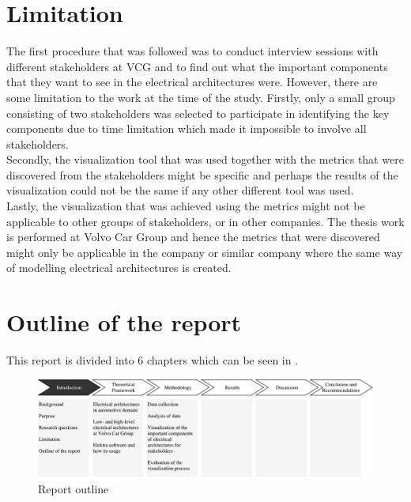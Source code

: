 \section{Limitation} \label{Limitation_ref}
The first procedure that was followed was to conduct interview sessions with different stakeholders at VCG and to find out what the important components that they want to see in the electrical architectures were. However, there are some limitation to the work at the time of the study. Firstly, only a small group consisting of two stakeholders was selected to participate in identifying the key components due to time limitation which made it impossible to involve all stakeholders. \\

Secondly, the visualization tool that was used together with the metrics that were discovered from the stakeholders might be specific and perhaps the results of the visualization could not be the same if any other different tool was used. \\

Lastly, the visualization that was achieved using the metrics might not be applicable to other groups of stakeholders, or in other companies. The thesis work is performed at Volvo Car Group and hence the metrics that were discovered might only be applicable in the company or similar company where the same way of modelling electrical architectures is created.


\section{Outline of the report} \label{Outline_ref}
This report is divided into 6 chapters which can be seen in . 
\begin{figure}[H]
\centering
\captionsetup{justification=centering}
\vspace{0cm}%
\includegraphics[width=1\linewidth]{figure/report_outline.pdf}
\caption{Report outline}
\end{figure}